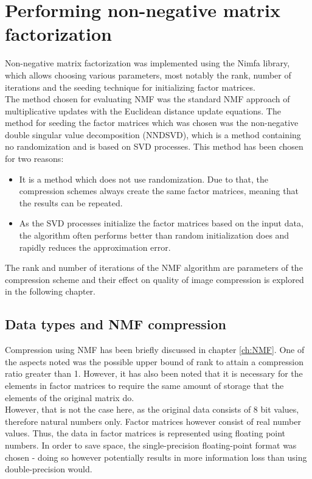 \documentclass[thesis=M,english]{FITthesis}[2012/10/20]
\begin{document}
\section{Performing non-negative matrix factorization}
Non-negative matrix factorization was implemented using the Nimfa library, which
allows choosing various parameters, most notably the rank, number of iterations and
the seeding technique for initializing factor matrices.
\\

The method chosen for evaluating NMF was the standard NMF approach of multiplicative
updates with the Euclidean distance update equations. The method for seeding
the factor matrices which was chosen was the non-negative double singular value
decomposition (NNDSVD)\cite{nndsvd}, which is a method containing no randomization
and is based on SVD processes. This method has been chosen for two reasons:
\begin{itemize}
  \item It is a method which does not use randomization. Due to that, the
  compression schemes always create the same factor matrices, meaning that the
  results can be repeated.
  \item As the SVD processes initialize the factor matrices based on the input
  data, the algorithm often performs better than random initialization does
  and rapidly reduces the approximation error.\cite{nndsvd}
\end{itemize}

The rank and number of iterations of the NMF algorithm are parameters of the
compression scheme and their effect on quality of image compression is explored
in the following chapter.


\subsection{Data types and NMF compression}
Compression using NMF has been briefly discussed in chapter \ref{ch:NMF}. One of
the aspects noted was the possible upper bound of rank to attain a compression ratio
greater than 1. However, it has also been noted that it is necessary for the elements
in factor matrices to require the same amount of storage that the elements of the
original matrix do.
\\

However, that is not the case here, as the original data consists of 8 bit values,
therefore natural numbers only. Factor matrices however consist of real number
values. Thus, the data in factor matrices is represented using floating point
numbers. In order to save space, the single-precision floating-point format was
chosen - doing so however potentially results in more information loss than
using double-precision would.
\end{document}

